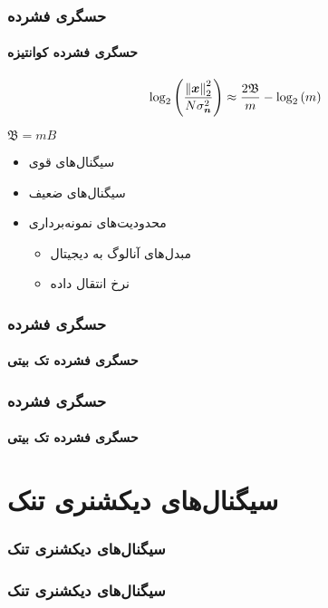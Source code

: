 \begin{frame}
\frametitle{حسگری فشرده}
\framesubtitle{حسگری فشرده کوانتیزه}
\begin{block}{}
\begin{align}
\label{eq5}
\log_{2}\left( \dfrac{\left\lVert\bm{x}\right\rVert_{2}^{2}}{N \sigma^{2}_{\bm{n}}}\right)\approx \dfrac{2\mathfrak{B}}{m}-\log_{2}\left(m\right)
\end{align}
\end{block}
\begin{center}
$\mathfrak{B}=mB$
\end{center}
\cite{laska2012regime}
\pause
\begin{itemize}
\item{
سیگنال‌های قوی}
\item{
سیگنال‌های ضعیف}
\end{itemize}
\pause
\begin{itemize}
\item{محدودیت‌های نمونه‌برداری}
\begin{itemize}
\item{مبدل‌های آنالوگ به دیجیتال}
\item{نرخ انتقال داده}
\end{itemize}
\end{itemize}
\end{frame}

\begin{frame}
\frametitle{حسگری فشرده}
\framesubtitle{حسگری فشرده تک بیتی}
\end{frame}

\begin{frame}
\frametitle{حسگری فشرده}
\framesubtitle{حسگری فشرده تک بیتی}
\end{frame}


\section{سیگنال‌های دیکشنری تنک\hfill}

\begin{frame}
\frametitle{سیگنال‌های دیکشنری تنک}

\end{frame}

\begin{frame}
\frametitle{سیگنال‌های دیکشنری تنک}

\end{frame}

